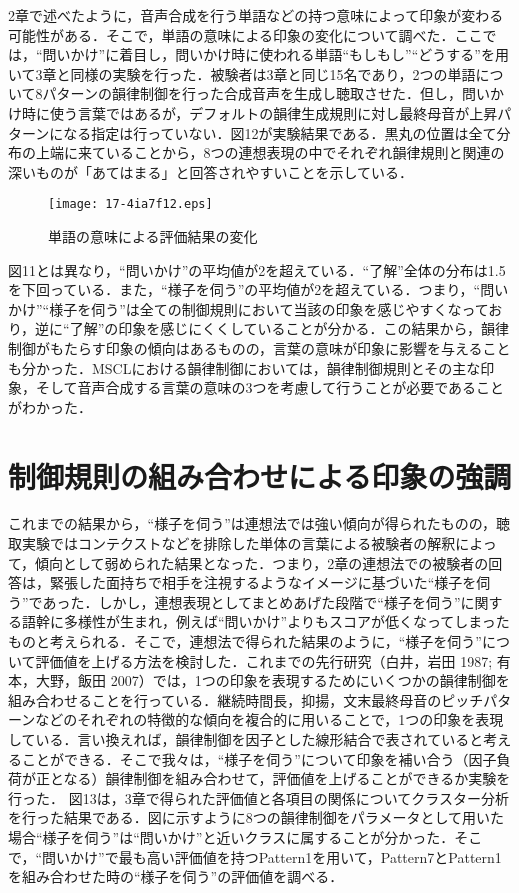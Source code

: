 \documentclass[japanese]{jnlp_1.4}
\begin{document}
2章で述べたように，音声合成を行う単語などの持つ意味によって印象が変わる可能性がある．そこで，単語の意味による印象の変化について調べた．ここでは，“問いかけ”に着目し，問いかけ時に使われる単語“もしもし”“どうする”を用いて3章と同様の実験を行った．被験者は3章と同じ15名であり，2つの単語について8パターンの韻律制御を行った合成音声を生成し聴取させた．但し，問いかけ時に使う言葉ではあるが，デフォルトの韻律生成規則に対し最終母音が上昇パターンになる指定は行っていない．図12が実験結果である．黒丸の位置は全て分布の上端に来ていることから，8つの連想表現の中でそれぞれ韻律規則と関連の深いものが「あてはまる」と回答されやすいことを示している．

\begin{figure}[t]
\begin{center}
 \texttt{[image: 17-4ia7f12.eps]}
\end{center}
\caption{単語の意味による評価結果の変化}
\end{figure}

図11とは異なり，“問いかけ”の平均値が2を超えている．“了解”全体の分布は1.5を下回っている．また，“様子を伺う”の平均値が2を超えている．つまり，“問いかけ”“様子を伺う”は全ての制御規則において当該の印象を感じやすくなっており，逆に“了解”の印象を感じにくくしていることが分かる．この結果から，韻律制御がもたらす印象の傾向はあるものの，言葉の意味が印象に影響を与えることも分かった．MSCLにおける韻律制御においては，韻律制御規則とその主な印象，そして音声合成する言葉の意味の3つを考慮して行うことが必要であることがわかった．



\section{制御規則の組み合わせによる印象の強調}

これまでの結果から，“様子を伺う”は連想法では強い傾向が得られたものの，聴取実験ではコンテクストなどを排除した単体の言葉による被験者の解釈によって，傾向として弱められた結果となった．つまり，2章の連想法での被験者の回答は，緊張した面持ちで相手を注視するようなイメージに基づいた“様子を伺う”であった．しかし，連想表現としてまとめあげた段階で“様子を伺う”に関する語幹に多様性が生まれ，例えば“問いかけ”よりもスコアが低くなってしまったものと考えられる．そこで，連想法で得られた結果のように，“様子を伺う”について評価値を上げる方法を検討した．これまでの先行研究（白井，岩田 1987; 有本，大野，飯田 2007）では，1つの印象を表現するためにいくつかの韻律制御を組み合わせることを行っている．継続時間長，抑揚，文末最終母音のピッチパターンなどのそれぞれの特徴的な傾向を複合的に用いることで，1つの印象を表現している．言い換えれば，韻律制御を因子とした線形結合で表されていると考えることができる．そこで我々は，“様子を伺う”について印象を補い合う（因子負荷が正となる）韻律制御を組み合わせて，評価値を上げることができるか実験を行った．
図13は，3章で得られた評価値と各項目の関係についてクラスター分析を行った結果である．図に示すように8つの韻律制御をパラメータとして用いた場合“様子を伺う”は“問いかけ”と近いクラスに属することが分かった．そこで，“問いかけ”で最も高い評価値を持つPattern1を用いて，Pattern7とPattern1を組み合わせた時の“様子を伺う”の評価値を調べる．
\end{document}
